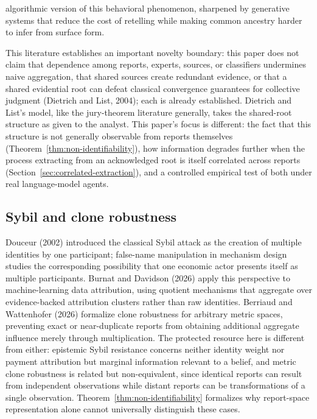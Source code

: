 \documentclass[11pt]{article}
\theoremstyle{definition}
\begin{document}
algorithmic version of this behavioral phenomenon, sharpened by generative systems that reduce the cost of retelling while making common ancestry harder to infer from surface form.

This literature establishes an important novelty boundary: this paper does not claim that dependence among reports, experts, sources, or classifiers undermines naive aggregation, that shared sources create redundant evidence, or that a shared evidential root can defeat classical convergence guarantees for collective judgment (Dietrich and List, 2004); each is already established. Dietrich and List's model, like the jury-theorem literature generally, takes the shared-root structure as given to the analyst. This paper's focus is different: the fact that this structure is not generally observable from reports themselves (Theorem~\ref{thm:non-identifiability}), how information degrades further when the process extracting from an acknowledged root is itself correlated across reports (Section~\ref{sec:correlated-extraction}), and a controlled empirical test of both under real language-model agents.

\subsection{Sybil and clone robustness}

Douceur (2002) introduced the classical Sybil attack as the creation of multiple identities by one participant; false-name manipulation in mechanism design studies the corresponding possibility that one economic actor presents itself as multiple participants. Burnat and Davidson (2026) apply this perspective to machine-learning data attribution, using quotient mechanisms that aggregate over evidence-backed attribution clusters rather than raw identities. Berriaud and Wattenhofer (2026) formalize clone robustness for arbitrary metric spaces, preventing exact or near-duplicate reports from obtaining additional aggregate influence merely through multiplication. The protected resource here is different from either: epistemic Sybil resistance concerns neither identity weight nor payment attribution but marginal information relevant to a belief, and metric clone robustness is related but non-equivalent, since identical reports can result from independent observations while distant reports can be transformations of a single observation. Theorem~\ref{thm:non-identifiability} formalizes why report-space representation alone cannot universally distinguish these cases.
\end{document}
